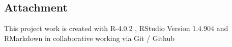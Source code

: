 \documentclass[
]{article}
\begin{document}
\newpage

\hypertarget{attachment}{%
\subsection{Attachment}\label{attachment}}

This project work is created with R-4.0.2 , RStudio Version 1.4.904 and
RMarkdown in collaborative working via Git / Github
\end{document}
